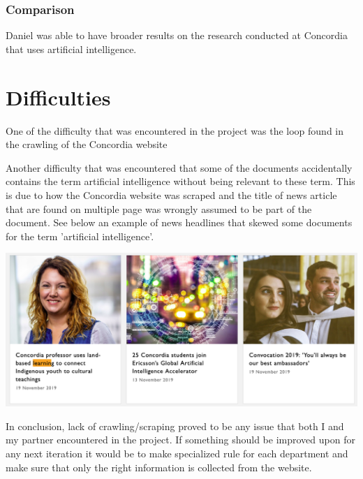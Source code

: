 \subsection{Comparison}

\par Daniel was able to have broader results on the research conducted at Concordia that uses artificial intelligence. 

\chapter{Difficulties}

\par One of the difficulty that was encountered in the project was the loop found in the crawling of the Concordia website
\par Another difficulty that was encountered that some of the documents accidentally contains the term artificial intelligence without being relevant to these term. This is due to how the Concordia website was scraped and the title of news article that are found on multiple page was wrongly assumed to be part of the document. See below an example of news headlines that skewed some documents for the term 'artificial intelligence'.
\begin{center}
    \includegraphics[width=\textwidth]{difficulty1.png}
\end{center}
\par In conclusion, lack of crawling/scraping proved to be any issue that both I and my partner encountered in the project. If something should be improved upon for any next iteration it would be to make specialized rule for each department and make sure that only the right information is collected from the website.